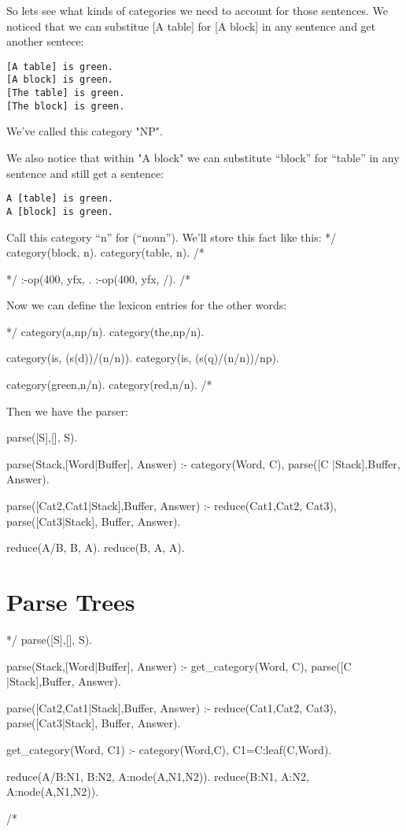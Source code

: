 \documentclass{book}[9pt]
\newenvironment{code}%
{\small \verbatim}%
{\endverbatim \large}
\begin{document}
So lets see what kinds of categories we need to account for those sentences.
We noticed that we can substitue [A table] for [A block]
in any sentence and get another sentece:
\begin{verbatim}
[A table] is green.
[A block] is green.
[The table] is green.
[The block] is green.
\end{verbatim}
\noindent We've called this category "NP".

We also notice that within "A block" we can substitute ``block'' for ``table'' 
in any sentence and still get a sentence:
\begin{verbatim}
A [table] is green.
A [block] is green.
\end{verbatim}
\noindent Call this category ``n'' for (``noun'').  We'll store this fact like this:
\begin{code}
*/
category(block, n).
category(table, n).
/*
\end{code}


\begin{code}
*/
:-op(400, yfx, \).
:-op(400, yfx, /).
/*
\end{code}

Now we can define the lexicon entries for the other words:

\begin{code}
*/
category(a,np/n).
category(the,np/n).

category(is, (s(d)\np)/(n/n)).
category(is, (s(q)/(n/n))/np).

category(green,n/n).
category(red,n/n).
/*
\end{code}

Then we have the parser:

\begin{code}
parse([S],[], S).

parse(Stack,[Word|Buffer],  Answer) :-
        category(Word, C),
        parse([C |Stack],Buffer, Answer).

parse([Cat2,Cat1|Stack],Buffer, Answer) :-
        reduce(Cat1,Cat2, Cat3),
        parse([Cat3|Stack], Buffer, Answer).

reduce(A/B,    B,      A).
reduce(B,      A\B,    A).
\end{code}

\section{Parse Trees}

\begin{code}
*/
parse([S],[], S).

parse(Stack,[Word|Buffer],  Answer) :-
        get_category(Word, C),
        parse([C |Stack],Buffer, Answer).

parse([Cat2,Cat1|Stack],Buffer, Answer) :-
        reduce(Cat1,Cat2, Cat3),
        parse([Cat3|Stack], Buffer, Answer).


get_category(Word, C1) :-
        category(Word,C),
        C1=C:leaf(C,Word).

reduce(A/B:N1,    B:N2,    A:node(A,N1,N2)).
reduce(B:N1,    A\B:N2,    A:node(A,N1,N2)).

/*
\end{code}
\end{document}

